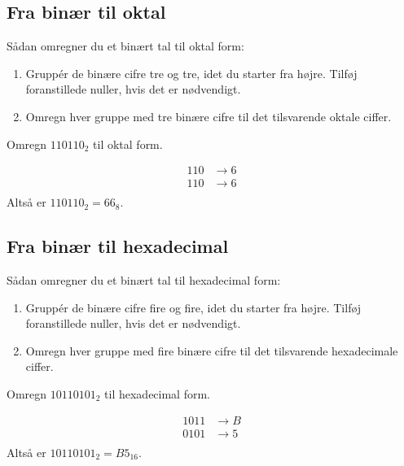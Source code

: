 \subsection*{Fra binær til oktal}
Sådan omregner du et binært tal til oktal form:
\begin{enumerate}
    \item Gruppér de binære cifre tre og tre, idet du starter fra højre. Tilføj foranstillede nuller, hvis det er nødvendigt.
    \item Omregn hver gruppe med tre binære cifre til det tilsvarende oktale ciffer.
\end{enumerate}

\begin{example}Omregn \(110110_2\) til oktal form.

\begin{solution}
\[
\begin{aligned}
110 & \rightarrow 6 \\
110 & \rightarrow 6 \\
\end{aligned}
\]
Altså er \(110110_2 = 66_8\). \end{solution}

\end{example}

\subsection*{Fra binær til hexadecimal}
Sådan omregner du et binært tal til hexadecimal form:
\begin{enumerate}
    \item Gruppér de binære cifre fire og fire, idet du starter fra højre. Tilføj foranstillede nuller, hvis det er nødvendigt.
    \item Omregn hver gruppe med fire binære cifre til det tilsvarende hexadecimale ciffer.
\end{enumerate}

\begin{example}Omregn \(10110101_2\) til hexadecimal form.

\begin{solution}
\[
\begin{aligned}
1011 & \rightarrow B \\
0101 & \rightarrow 5 \\
\end{aligned}
\]
Altså er \(10110101_2 = B5_{16}\). \end{solution}

\end{example}

